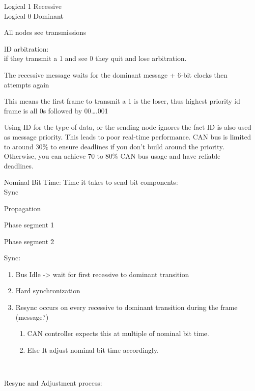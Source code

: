 



Logical 1 Recessive\\
Logical 0 Dominant

All nodes see transmissions

ID arbitration:\\
if they transmit a 1 and see 0 they quit and lose arbitration.

The recessive message waits for the dominant message + 6-bit clocks then
attempts again

This means the first frame to transmit a 1 is the loser, thus highest
priority id frame is all 0s followed by 00\ldots.001

Using ID for the type of data, or the sending node ignores the fact ID is
also used as message priority. This leads to poor real-time performance.
CAN bus is limited to around 30\% to ensure deadlines if you don't build
around the priority. Otherwise, you can achieve 70 to 80\% CAN bus usage and
have reliable deadlines.

Nominal Bit Time: Time it takes to send bit components:\\
Sync

Propagation

Phase segment 1

Phase segment 2

Sync:

\begin{enumerate}
\def\labelenumi{\arabic{enumi}.}
\item
  Bus Idle -\textgreater{} wait for first recessive to dominant
  transition
\item
  Hard synchronization
\item
  Resync occurs on every recessive to dominant transition during the
  frame (message?)

  \begin{enumerate}
  \def\labelenumii{\alph{enumii}.}
  \item
    CAN controller expects this at multiple of nominal bit time.
  \item
    Else It adjust nominal bit time accordingly.
  \end{enumerate}
\end{enumerate}

~

Resync and Adjustment process:

